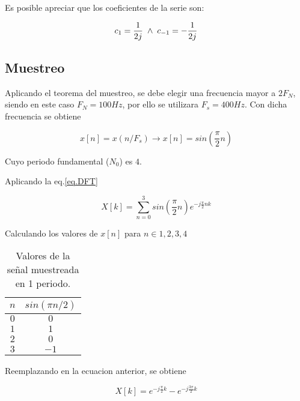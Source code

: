 \documentclass[letterpaper]{article}
\begin{document}
    Es posible apreciar que los coeficientes de la serie son: 

    \begin{equation}
        c_1 = \frac{1}{2j} \hspace*{.1cm} \land \hspace*{.1cm} c_{-1}=-\frac{1}{2j}
    \end{equation}

    \subsection*{Muestreo}

    Aplicando el teorema del muestreo, se debe elegir una frecuencia mayor a $2F_N$, siendo 
    en este caso $F_N=100Hz$, por ello se utilizara $F_s=400Hz$. Con dicha frecuencia se obtiene 

    \begin{equation}
        x[n]=x(n/F_s) \rightarrow x[n]= sin\left( \frac{\pi}{2} n\right)
    \end{equation}

    Cuyo periodo fundamental ($N_0$) es $4$.

    Aplicando la eq.\ref{eq.DFT}

    \begin{equation}
        X[k]= \sum_{n=0}^{3} sin\left( \frac{\pi}{2} n\right) e^{-j\frac{\pi}{2} nk}
    \end{equation}

    Calculando los valores de $x[n]$ para $n\in {1, 2, 3 ,4}$

    \begin{table}[H]
        \centering
        \begin{tabular}{|c|c|}
            \hline $n$ & $sin(\pi n/2)$ \\ 
            \hline $0$ & $0$ \\
            \hline $1$ & $1$ \\
            \hline $2$ & $0$ \\
            \hline $3$ & $-1$ \\
            \hline
        \end{tabular}
        \caption{Valores de la señal muestreada en 1 periodo.}
    \end{table}

    Reemplazando en la ecuacion anterior, se obtiene 

    \begin{equation}
        X[k]= e^{-j\frac{\pi}{2}k} - e^{-j\frac{ 3 \pi}{2}k}
    \end{equation}
\end{document}

